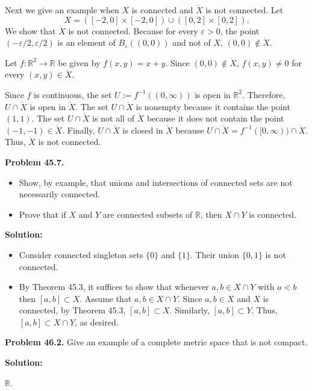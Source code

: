 \documentclass[12pt]{article}
\def\black{\color{black}}
\def\green{\color{rltgreen}}
\newcommand\bi{\begin{itemize}}
\newcommand\ei{\end{itemize}}
\newcommand\itema{\item[(a)]}
\newcommand\itemb{\item[(b)]}
\renewcommand\|{\ | \ }
\newcommand\ra{\rightarrow}
\newcommand\R{\mathbb{R}}
\def\pb#1{{\green \bf Problem #1.}\hskip 8pt \black}
\def\sol{\textbf{Solution:}}
\newcommand\e\varepsilon
\begin{document}
Next we give an example when $X$ is connected and $\mathring X$ is not
connected.
Let 
\[
X = ([-2, 0] \times [-2, 0]) \cup ([0, 2] \times [0, 2]).
\]
We show that $\mathring X$ is not connected. Because for every $\e > 0$, 
the point $(-\e/2, \e/2)$ is an element of $B_{\e}((0, 0))$ and 
not of $X$, $(0, 0) \notin \mathring X$. 

Let $f: \R^2 \ra \R$ be given by $f(x, y) = x + y$. 
Since $(0, 0) \notin \mathring X$, $f(x, y) \neq 0$ for every 
$(x, y) \in \mathring X$.


Since 
$f$ is continuous, the set $U := f^{-1}((0, \infty))$ is open
in $\R^2$. Therefore, $U \cap \mathring X$ is open in $\mathring X$.
The set $U \cap \mathring X$ is nonempty because it contains 
the point $(1, 1)$. The set $U \cap \mathring X$ is not all of 
$\mathring X$ because it does not contain the point $(-1, -1) \in \mathring X$.
Finally, $U \cap \mathring X$ is closed in $\mathring X$ because
$U \cap \mathring X = f^{-1}([0, \infty)) \cap \mathring X$.
Thus, $\mathring X$ is not connected.


\pb{45.7}

\bi
\itema
Show, by example, that unions and intersections of connected sets are not 
necessarily connected.
\itemb
Prove that if $X$ and $Y$ are connected subsets of $\R$, then
$X \cap Y$ is connected.
\ei

\sol

\bi
\itema
Consider connected singleton sets $\{0\}$ and $\{1\}$. Their union
$\{0, 1\}$ is not connected.


\itemb
By Theorem 45.3, it suffices to show that whenever $a, b \in X \cap Y$ with
$a < b$ then $[a, b] \subset X$. Assume that $a, b \in X \cap Y$. 
Since $a, b \in X$ and $X$ is connected, by Theorem 45.3, 
$[a, b] \subset X$. Similarly, $[a, b] \subset Y$. Thus,
$[a, b] \subset X \cap Y$, as desired.
\ei


\pb{46.2}
Give an example of a complete metric space that is not compact.

\sol

$\R$.

\end{document}
